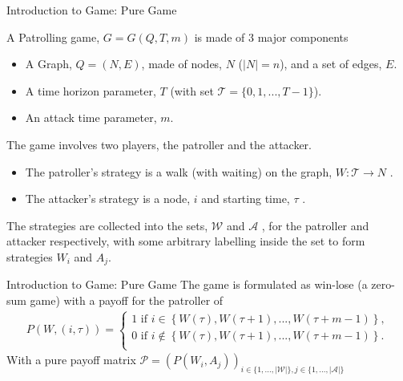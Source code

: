 \documentclass[11pt]{beamer}
\begin{document}
\hypertarget{Introduction to Game: Pure Game}{}
\begin{frame}{Introduction to Game: Pure Game}

A Patrolling game, $G=G(Q,T,m)$ is made of 3 major components
\begin{itemize}
\item A Graph, $Q=(N,E)$, made of nodes, $N$ ($|N|=n$), and a set of edges, $E$.
\item A time horizon parameter, $T$ (with set $\mathcal{T}=\{0,1,...,T-1\}$).
\item An attack time parameter, $m$.
\end{itemize}

The game involves two players, the patroller and the attacker.
\begin{itemize}
\item The patroller's strategy is a walk (with waiting) on the graph, $W:\mathcal{T} \rightarrow  N$ .
\item The attacker's strategy is a node, $i$ and starting time, $\tau$ .
\end{itemize} 
The strategies are collected into the sets, $\mathcal{W}$ and $\mathcal{A}$ , for the patroller and attacker respectively, with some arbitrary labelling inside the set to form strategies $W_{i}$ and $A_{j}$.

\end{frame}

\begin{frame}{Introduction to Game: Pure Game}
The game is formulated as win-lose (a zero-sum game) with a payoff for the patroller of
\begin{align*}
P(W,(i,\tau))=\left\{ \begin{array}{l}
1 \text{  if  } i \in \left\{ W(\tau),W(\tau+1),...,W(\tau+m-1) \right\} ,\\
0 \text{  if  } i \notin \left\{ W(\tau),W(\tau+1),...,W(\tau+m-1) \right\} .\\
\end{array}\right.
\end{align*}
With a pure payoff matrix $\mathcal{P}=(P(W_{i},A_{j}))_{i \in \{ 1,...,|\mathcal{W}| \}, j \in \{ 1,...,|\mathcal{A}| \}}$
\end{frame}
\end{document}
